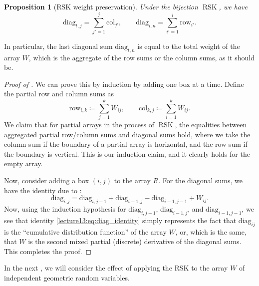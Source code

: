 \documentclass[letterpaper,11pt,oneside,reqno]{book}
\numberwithin{equation}{chapter}  %
\newtheorem{proposition}{Proposition}[chapter]  %
\theoremstyle{definition}
\begin{document}
\begin{proposition}[RSK weight preservation]
	\label{lecture13:prop:RSK_weight_preservation}
	Under the bijection $\operatorname{RSK}$, we have
	\begin{equation*}
		\mathrm{diag}_{t,j}=\sum_{j'=1}^j\mathrm{col}_{j'},\qquad
		\mathrm{diag}_{i,n}=\sum_{i'=1}^i\mathrm{row}_{i'}.
	\end{equation*}
\end{proposition}
In particular, the last diagonal sum $\mathrm{diag}_{t,n}$
is equal to the total weight of the array $W$, which is the
aggregate of the row sums or the column sums, as it should
be.
\begin{proof}[Proof of ]
	We can prove this by induction by adding one box at a time.
	Define the partial row and column sums
	as
	\begin{equation*}
		\mathrm{row}_{i,k}\coloneqq \sum_{j=1}^k W_{ij}, \qquad
		\mathrm{col}_{k,j} \coloneqq \sum_{i=1}^k W_{ij}.
	\end{equation*}
	We claim that for partial arrays in the process of $\operatorname{RSK}$,
	the equalities between aggregated partial row/column sums and diagonal sums hold,
	where we take the column sum if the boundary of a partial array is horizontal,
	and the row sum if the boundary is vertical. This is our induction
	claim, and it clearly holds for the empty array.

	Now, consider adding a box $(i,j)$ to the array $R$.
	For the diagonal sums, we have the identity
	due to :
	\begin{equation}
		\label{lecture13:eq:diag_identity}
		\mathrm{diag}_{i,j} = \mathrm{diag}_{i,j-1} + \mathrm{diag}_{i-1,j} - \mathrm{diag}_{i-1,j-1} + W_{ij}.
	\end{equation}
	Now, using the induction hypothesis for
	$\mathrm{diag}_{i,j-1}$, $\mathrm{diag}_{i-1,j}$,
	and $\mathrm{diag}_{i-1,j-1}$, we see that
	identity \eqref{lecture13:eq:diag_identity}
	simply represents the fact that
	$\mathrm{diag}_{ij}$ is the ``cumulative distribution function'' of the
	array $W$, or, which is the same, that $W$ is the second
	mixed partial (discrete) derivative of the diagonal sums.
	This completes the proof.
\end{proof}

In the next
, we will consider the effect of applying the RSK
to the array $W$ of independent geometric random variables.
\end{document}
